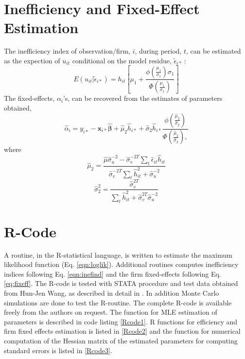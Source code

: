 \section{Inefficiency and Fixed-Effect Estimation}
The inefficiency index of observation/firm, $i$, during period, $t$, can be estimated as the expection of $u_{it}$ conditional on the model residue, $\tilde{\epsilon}_{i*}~:$
\begin{equation}
\label{eqn:inefind}
E\left(u_{it}|\tilde{\epsilon}_{i*}\right)=h_{it}\left[\mu_{1}+\frac{\phi\left(\frac{\mu_{1}}{\sigma_1}\right)\sigma_{1}}{\Phi\left(\frac{\mu_{1}}{\sigma_1}\right)}\right]
\end{equation}
The fixed-effects, $\alpha_{i}$'s, can be recovered from the estimates of parameters obtained, 
\begin{equation}
\label{eq:fixeff}
\hat{\alpha}_{i}=y_{i*}-\boldsymbol{x}_{i*}\boldsymbol{\hat{\beta}}+\hat{\mu}_{2}\hat{h}_{i*}+\hat{\sigma}_{2}\hat{h}_{i*}\frac{\phi\left(\frac{\hat{\mu}_{2}}{\hat{\sigma}_2}\right)}{\Phi\left(\frac{\hat{\mu}_{2}}{\hat{\sigma}_2}\right),}
\end{equation}
where
\begin{equation}
\hat{\mu}_{2}=\frac{\hat{\mu}\hat{\sigma}^{-2}_{u}-\hat{\sigma}^{-2T}_{v}\sum_{t}\hat{\epsilon}_{it}\hat{h}_{it}}{\hat{\sigma}^{-2T}_{v}\sum_{t}\hat{h}_{it}^{2}+\hat{\sigma}^{-2}_{u}}
\end{equation}
\begin{equation}
\hat{\sigma}^{2}_{2}=\frac{\hat{\sigma}^{2T}_{v}}{\sum_{t}\hat{h}_{it}^{2}+\hat{\sigma}^{2T}_{v}\hat{\sigma}^{-2}_{u}}
\end{equation}
\section{R-Code}
A routine, in the R-statistical language, is written to estimate the maximum likelihood function (Eq. \ref{eqn:loglik}). Additional routines computes inefficiency indices following Eq. \ref{eqn:inefind} and the firm fixed-effects following Eq. \ref{eq:fixeff}. The R-code is tested with STATA procedure and test data obtained from Hun-Jen Wang, as described in detail in \cite{Wang2010}. In addition Monte Carlo simulations are done to test the R-routine. The complete R-code is available freely from the authors on request. The function for MLE estimation of parameters is described in code listing \ref{Rcode1}. R functions for efficiency and firm fixed effects estimation is listed in \ref{Rcode2} and the function for numerical computation of the Hessian matrix of the estimated parameters for computing standard errors is listed in \ref{Rcode3}.
\vskip 1cm

